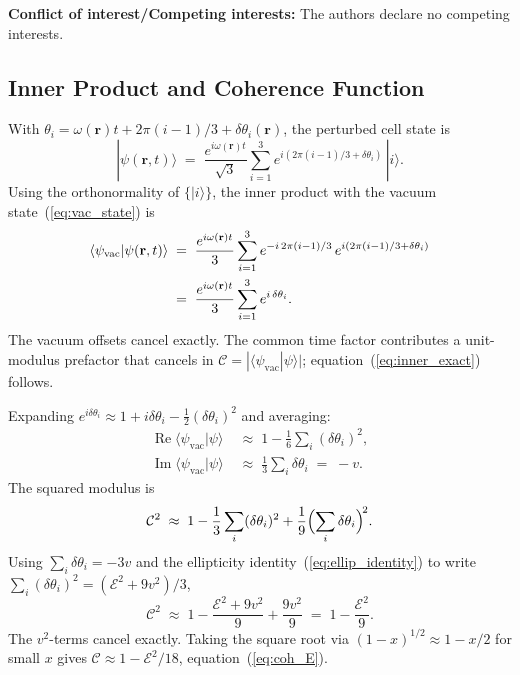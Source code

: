 \documentclass[pdflatex,sn-mathphys-num]{sn-jnl}%
\theoremstyle{thmstyleone}%
\theoremstyle{thmstyletwo}%
\theoremstyle{thmstylethree}%
\begin{document}
\textbf{Conflict of interest/Competing interests:}
The authors declare no competing interests.



\begin{appendices}
\section{Inner Product and Coherence Function}
\label{app:inner_product}

With $\theta_i = \omega(\mathbf{r})t + 2\pi(i-1)/3
+ \delta\theta_i(\mathbf{r})$, the perturbed cell state is
\begin{equation}
    |\psi(\mathbf{r},t)\rangle
    \;=\;
    \frac{e^{i\omega(\mathbf{r})t}}{\sqrt{3}}
    \sum_{i=1}^{3}e^{i(2\pi(i-1)/3+\delta\theta_i)}\,|i\rangle.
\end{equation}
Using the orthonormality of $\{|i\rangle\}$, the inner product
with the vacuum state~(\ref{eq:vac_state}) is
\begin{align}
    \langle\psi_{\mathrm{vac}}|\psi(\mathbf{r},t)\rangle
    &\;=\;
    \frac{e^{i\omega(\mathbf{r})t}}{3}\sum_{i=1}^{3}
    e^{-i\,2\pi(i-1)/3}\,e^{i(2\pi(i-1)/3+\delta\theta_i)}
    \notag\\
    &\;=\;
    \frac{e^{i\omega(\mathbf{r})t}}{3}\sum_{i=1}^{3}
    e^{i\,\delta\theta_i}.
    \label{eq:app_inner}
\end{align}
The vacuum offsets cancel exactly. The common time factor
contributes a unit-modulus prefactor that cancels in
$\mathcal{C}=|\langle\psi_{\mathrm{vac}}|\psi\rangle|$;
equation~(\ref{eq:inner_exact}) follows.

Expanding $e^{i\delta\theta_i}\approx 1+i\delta\theta_i
-\tfrac{1}{2}(\delta\theta_i)^2$ and averaging:
\begin{align}
    \operatorname{Re}\langle\psi_{\mathrm{vac}}|\psi\rangle
    &\;\approx\;
    1-\frac{1}{6}\sum_i(\delta\theta_i)^2,\\
    \operatorname{Im}\langle\psi_{\mathrm{vac}}|\psi\rangle
    &\;\approx\;
    \frac{1}{3}\sum_i\delta\theta_i\;=\;-v.
\end{align}
The squared modulus is
\begin{equation}
    \mathcal{C}^2
    \;\approx\;
    1-\frac{1}{3}\sum_i(\delta\theta_i)^2
    +\frac{1}{9}\Bigl(\sum_i\delta\theta_i\Bigr)^{\!2}.
\end{equation}
Using $\sum_i\delta\theta_i=-3v$ and the ellipticity
identity~(\ref{eq:ellip_identity}) to write
$\sum_i(\delta\theta_i)^2=(\mathcal{E}^2+9v^2)/3$,
\begin{equation}
    \mathcal{C}^2
    \;\approx\;
    1-\frac{\mathcal{E}^2+9v^2}{9}+\frac{9v^2}{9}
    \;=\;
    1-\frac{\mathcal{E}^2}{9}.
\end{equation}
The $v^2$-terms cancel exactly. Taking the square root via
$(1-x)^{1/2}\approx 1-x/2$ for small $x$ gives
$\mathcal{C}\approx 1-\mathcal{E}^2/18$,
equation~(\ref{eq:coh_E}).


\end{appendices}
\end{document}
